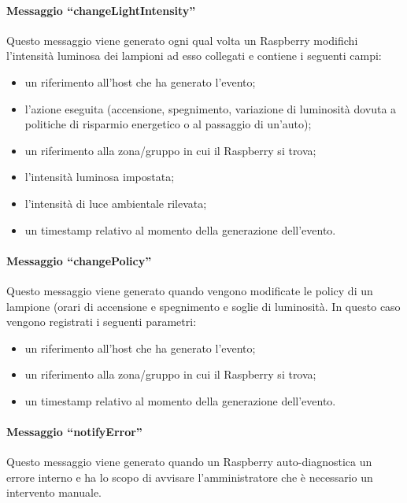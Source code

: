 \paragraph{Messaggio ``changeLightIntensity''}
Questo messaggio viene generato ogni qual volta un Raspberry modifichi l'intensità luminosa dei lampioni ad esso collegati e contiene i seguenti campi:
\begin{itemize}
 \item un riferimento all'host che ha generato l'evento;
 \item l'azione eseguita (accensione, spegnimento, variazione di luminosità dovuta a politiche di risparmio energetico o al passaggio di un'auto);
 \item un riferimento alla zona/gruppo in cui il Raspberry si trova;
 \item l'intensità luminosa impostata;
 \item l'intensità di luce ambientale rilevata;
 \item un timestamp relativo al momento della generazione dell'evento.
\end{itemize}
\paragraph{Messaggio ``changePolicy''}
Questo messaggio viene generato quando vengono modificate le policy di un lampione (orari di accensione e spegnimento e soglie di luminosità.
In questo caso vengono registrati i seguenti parametri:
\begin{itemize}
 \item un riferimento all'host che ha generato l'evento;
 \item un riferimento alla zona/gruppo in cui il Raspberry si trova;
 \item un timestamp relativo al momento della generazione dell'evento.
\end{itemize}
\paragraph{Messaggio ``notifyError''}
Questo messaggio viene generato quando un Raspberry auto-diagnostica un errore interno e ha lo scopo di avvisare l'amministratore che è necessario un intervento manuale.

